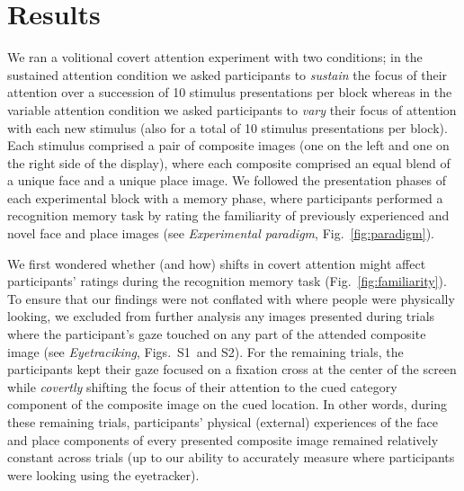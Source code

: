 \documentclass[english]{article}
\newcommand{\gazeLocations}{S1}
\newcommand{\excludedTrials}{S2}
\begin{document}
\section*{Results}

We ran a volitional covert attention experiment with two conditions; in the
sustained attention condition we asked participants to \textit{sustain} the
focus of their attention over a succession of 10 stimulus presentations per
block whereas in the variable attention condition we asked participants to
\textit{vary} their focus of attention with each new stimulus (also for a total
of 10 stimulus presentations per block). Each stimulus comprised a pair of
composite images (one on the left and one on the right side of the display),
where each composite comprised an equal blend of a unique face and a unique
place image. We followed the presentation phases of each experimental block
with a memory phase, where participants performed a recognition memory task by
rating the familiarity of previously experienced and novel face and place
images (see \textit{Experimental paradigm}, Fig.~\ref{fig:paradigm}).

We first wondered whether (and how) shifts in covert attention might affect
participants' ratings during the recognition memory task
(Fig.~\ref{fig:familiarity}). To ensure that our findings were not conflated
with where people were physically looking, we excluded from further analysis
any images presented during trials where the participant's gaze touched on any
part of the attended composite image (see \textit{Eyetraciking},
Figs.~\gazeLocations~and \excludedTrials). For the remaining trials, the
participants kept their gaze focused on a fixation cross at the center of the
screen while \textit{covertly} shifting the focus of their attention to the
cued category component of the composite image on the cued location. In other
words, during these remaining trials, participants' physical (external)
experiences of the face and place components of every presented composite image
remained relatively constant across trials (up to our ability to accurately
measure where participants were looking using the eyetracker). 
\end{document}
